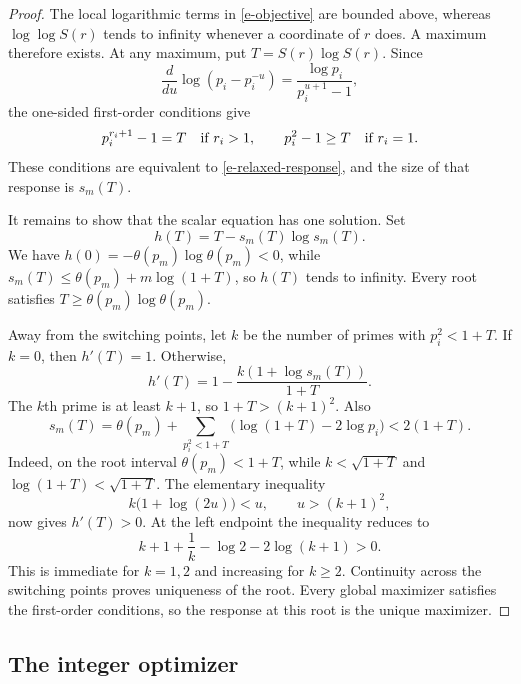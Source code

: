 \begin{proof}
The local logarithmic terms in \eqref{e-objective} are bounded above,
whereas \(\log\log S(r)\) tends to infinity whenever a coordinate of
\(r\) does. A maximum therefore exists. At any maximum, put
\(T=S(r)\log S(r)\). Since
\[
    \frac{d}{du}\log(p_i-p_i^{-u})
    =
    \frac{\log p_i}{p_i^{u+1}-1},
\]
the one-sided first-order conditions give
\[
    p_i^{r_i+1}-1=T
    \quad\hbox{if \(r_i>1\)},\qquad
    p_i^2-1\geq T
    \quad\hbox{if \(r_i=1\)}.
\]
These conditions are equivalent to \eqref{e-relaxed-response}, and the
size of that response is \(s_m(T)\).

It remains to show that the scalar equation has one solution. Set
\[
    h(T)=T-s_m(T)\log s_m(T).
\]
We have \(h(0)=-\theta(p_m)\log\theta(p_m)<0\), while
\(s_m(T)\leq\theta(p_m)+m\log(1+T)\), so \(h(T)\) tends to infinity.
Every root satisfies \(T\geq\theta(p_m)\log\theta(p_m)\).

Away from the switching points, let \(k\) be the number of primes with
\(p_i^2<1+T\). If \(k=0\), then \(h'(T)=1\). Otherwise,
\[
    h'(T)
    =
    1-\frac{k(1+\log s_m(T))}{1+T}.
\]
The \(k\)th prime is at least \(k+1\), so \(1+T>(k+1)^2\). Also
\[
    s_m(T)
    =
    \theta(p_m)
    +
    \sum_{p_i^2<1+T}
    \bigl(\log(1+T)-2\log p_i\bigr)
    <2(1+T).
\]
Indeed, on the root interval \(\theta(p_m)<1+T\), while
\(k<\sqrt{1+T}\) and \(\log(1+T)<\sqrt{1+T}\).
The elementary inequality
\[
    k\bigl(1+\log(2u)\bigr)<u,
    \qquad u>(k+1)^2,
\]
now gives \(h'(T)>0\). At the left endpoint the inequality reduces to
\[
    k+1+\frac1k-\log2-2\log(k+1)>0.
\]
This is immediate for \(k=1,2\) and increasing for \(k\geq2\).
Continuity across the switching points proves uniqueness of the root.
Every global maximizer satisfies the first-order conditions, so the
response at this root is the unique maximizer.
\end{proof}

\subsection{The integer optimizer}
\label{s-integer-prefix}

